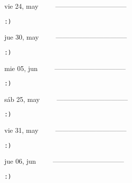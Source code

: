 \documentclass[letterpaper,10pt]{article}
\begin{document}
\begin{multicols}{3}
{vie 24, may\ \ \ \ \ --------------------------------}
\begin{flushright}\begin{small}\texttt{:)}\end{small}\end{flushright}
\vfill
{jue 30, may\ \ \ \ \ --------------------------------}
\begin{flushright}\begin{small}\texttt{:)}\end{small}\end{flushright}\par
\vfill
{mie 05, jun\ \ \ \ \ --------------------------------}
\begin{flushright}\begin{small}\texttt{:)}\end{small}\end{flushright}\par
\vfill
\end{multicols}
\vspace{1.05cm}

\begin{multicols}{3}
{sáb 25, may\ \ \ \ \ --------------------------------}
\begin{flushright}\begin{small}\texttt{:)}\end{small}\end{flushright}
\vfill
{vie 31, may\ \ \ \ \ --------------------------------}
\begin{flushright}\begin{small}\texttt{:)}\end{small}\end{flushright}\par
\vfill
{jue 06, jun\ \ \ \ \ --------------------------------}
\begin{flushright}\begin{small}\texttt{:)}\end{small}\end{flushright}\par
\vfill
\end{multicols}
\vspace{1.05cm}
\end{document}
